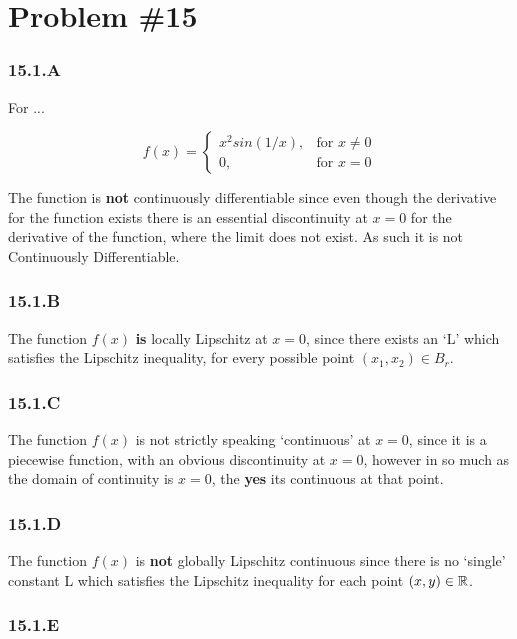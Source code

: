 
\section*{Problem \#15}

\subsubsection*{15.1.A}
For ...

$$
f(x) =
\begin{cases}
    x^{2}sin(1/x), & \text{for $x\neq0 $} \\
    0, & \text{for $x =0$}
\end{cases}
$$

The function is \textbf{not} continuously differentiable since even though the derivative for the function exists there is an essential discontinuity at $x =0$ for the derivative of the function, where the limit does not exist. As such it is not Continuously Differentiable.
\subsubsection*{15.1.B}

The function $f(x)$ \textbf{is} locally Lipschitz at $x=0$, since there exists an `L' which satisfies the Lipschitz inequality, for every possible point $(x_1, x_2) \in B_r  $.

\subsubsection*{15.1.C}

The function $f(x)$ is not strictly speaking `continuous' at $x=0$, since it is a piecewise function, with an obvious discontinuity at $x=0$, however in so much as the domain of continuity is $x=0$, the \textbf{yes} its continuous at that point.

\subsubsection*{15.1.D}

The function $f(x)$ is \textbf{not} globally Lipschitz continuous since there is no `single' constant L which satisfies the Lipschitz inequality for each point $(x,y) \in \mathbb{R}$.

\subsubsection*{15.1.E}

